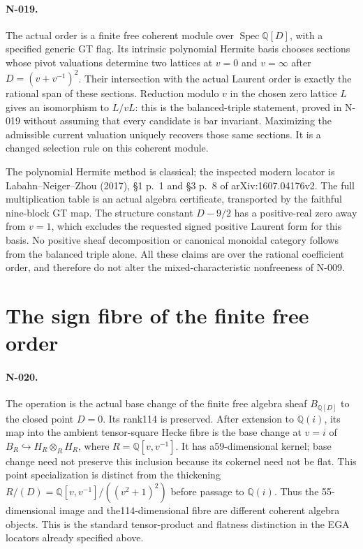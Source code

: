 \paragraph{N-019.}
The actual order is a finite free coherent module over
$\operatorname{Spec}\mathbb Q[D]$, with a specified generic GT flag.
Its intrinsic polynomial Hermite basis chooses sections whose pivot
valuations determine two lattices at $v=0$ and $v=\infty$ after
$D=(v+v^{-1})^2$. Their intersection with the actual Laurent order
is exactly the rational span of these sections. Reduction modulo $v$
in the chosen zero lattice $L$ gives an isomorphism to $L/vL$:
this is the balanced-triple statement,
proved in N-019 without assuming that every candidate is bar invariant.
Maximizing the admissible current valuation uniquely recovers those
same sections. It is a changed selection rule on this coherent module.

The polynomial Hermite method is classical; the inspected modern
locator is Labahn--Neiger--Zhou (2017), \S1 p.~1 and \S3 p.~8
of arXiv:1607.04176v2. The full multiplication table is an actual
algebra certificate, transported by the faithful nine-block GT map.
The structure constant $D-9/2$ has a positive-real zero away from
$v=1$, which excludes the requested signed positive Laurent form
for this basis. No positive sheaf decomposition or canonical
monoidal category follows from the balanced triple alone. All these
claims are over the rational coefficient order, and therefore do not
alter the mixed-characteristic nonfreeness of N-009.

\section{The sign fibre of the finite free order}
\paragraph{N-020.}
The operation is the actual base change of the finite free algebra
sheaf $B_{\mathbb Q[D]}$ to the closed point $D=0$. Its rank114
is preserved. After extension to $\mathbb Q(i)$, its map into the
ambient tensor-square Hecke fibre is the base change at $v=i$ of
$B_R\hookrightarrow H_R\otimes_R H_R$, where
$R=\mathbb Q[v,v^{-1}]$. It has a59-dimensional kernel; base change
need not preserve this inclusion because its cokernel need not be flat.
This point specialization is distinct from the thickening
$R/(D)=\mathbb Q[v,v^{-1}]/((v^2+1)^2)$ before passage to
$\mathbb Q(i)$. Thus the
55-dimensional image and the114-dimensional fibre are different
coherent algebra objects. This is the standard tensor-product and
flatness distinction in the EGA locators already specified above.

